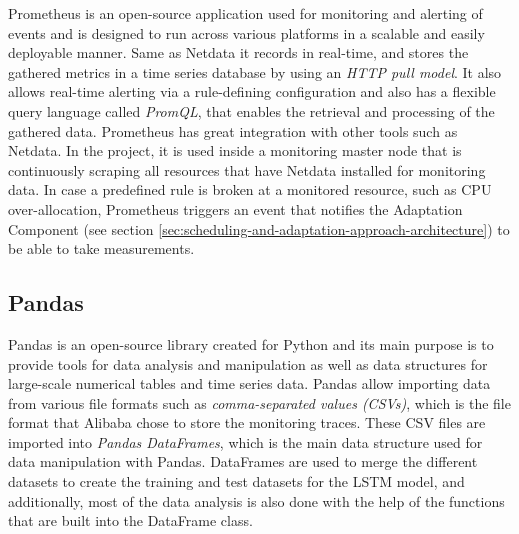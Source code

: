    Prometheus \cite{prometheusOverviewPrometheus} is an open-source application used for monitoring and alerting of events and is designed to run across various platforms in a scalable and easily deployable manner.
    Same as Netdata it records in real-time, and stores the gathered metrics in a time series database by using an \emph{HTTP pull model}. It also allows real-time alerting via a rule-defining configuration and also has a flexible query language called \emph{PromQL}, that enables the retrieval and processing of the gathered data. Prometheus has great integration with other tools such as Netdata.
    In the project, it is used inside a monitoring master node that is continuously scraping all resources that have Netdata installed for monitoring data. In case a predefined rule is broken at a monitored resource, such as CPU over-allocation, Prometheus triggers an event that notifies the Adaptation Component (see section \ref{sec:scheduling-and-adaptation-approach-architecture}) to be able to take measurements.


  \subsection{Pandas}
  \label{sec:pandas-third-party}

    Pandas \cite{pandasPandasDocumentationPandas} is an open-source library created for Python and its main purpose is to provide tools for data analysis and manipulation as well as data structures for large-scale numerical tables and time series data.
    Pandas allow importing data from various file formats such as \emph{comma-separated values (CSVs)}, which is the file format that Alibaba chose to store the monitoring traces.
    These CSV files are imported into \emph{Pandas DataFrames}, which is the main data structure used for data manipulation with Pandas. DataFrames are used to merge the different datasets to create the training and test datasets for the LSTM model, and additionally, most of the data analysis is also done with the help of the functions that are built into the DataFrame class.

